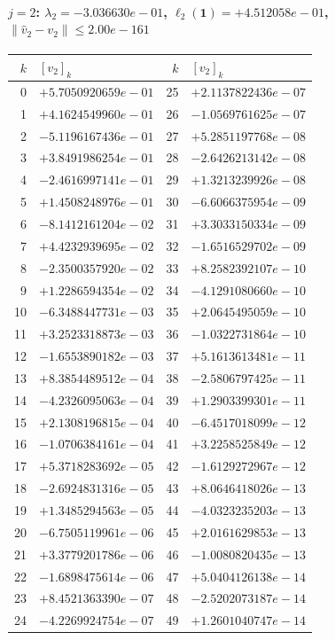 \documentclass[11pt]{article}
\begin{document}
\paragraph{$j = 2$: $\lambda_{2} = -3.036630e-01$, \quad $\ell_{2}(\mathbf{1}) = +4.512058e-01$, \quad $\|\hat v_{2} - v_{2}\| \leq 2.00e-161$}
\begin{center}
{\footnotesize
\begin{tabular}{r@{\;\;}l@{\quad}r@{\;\;}l}
\toprule
$k$ & $[v_{2}]_k$ & $k$ & $[v_{2}]_k$ \\
\midrule
0 & $+5.7050920659e-01$ & 25 & $+2.1137822436e-07$ \\
1 & $+4.1624549960e-01$ & 26 & $-1.0569761625e-07$ \\
2 & $-5.1196167436e-01$ & 27 & $+5.2851197768e-08$ \\
3 & $+3.8491986254e-01$ & 28 & $-2.6426213142e-08$ \\
4 & $-2.4616997141e-01$ & 29 & $+1.3213239926e-08$ \\
5 & $+1.4508248976e-01$ & 30 & $-6.6066375954e-09$ \\
6 & $-8.1412161204e-02$ & 31 & $+3.3033150334e-09$ \\
7 & $+4.4232939695e-02$ & 32 & $-1.6516529702e-09$ \\
8 & $-2.3500357920e-02$ & 33 & $+8.2582392107e-10$ \\
9 & $+1.2286594354e-02$ & 34 & $-4.1291080660e-10$ \\
10 & $-6.3488447731e-03$ & 35 & $+2.0645495059e-10$ \\
11 & $+3.2523318873e-03$ & 36 & $-1.0322731864e-10$ \\
12 & $-1.6553890182e-03$ & 37 & $+5.1613613481e-11$ \\
13 & $+8.3854489512e-04$ & 38 & $-2.5806797425e-11$ \\
14 & $-4.2326095063e-04$ & 39 & $+1.2903399301e-11$ \\
15 & $+2.1308196815e-04$ & 40 & $-6.4517018099e-12$ \\
16 & $-1.0706384161e-04$ & 41 & $+3.2258525849e-12$ \\
17 & $+5.3718283692e-05$ & 42 & $-1.6129272967e-12$ \\
18 & $-2.6924831316e-05$ & 43 & $+8.0646418026e-13$ \\
19 & $+1.3485294563e-05$ & 44 & $-4.0323235203e-13$ \\
20 & $-6.7505119961e-06$ & 45 & $+2.0161629853e-13$ \\
21 & $+3.3779201786e-06$ & 46 & $-1.0080820435e-13$ \\
22 & $-1.6898475614e-06$ & 47 & $+5.0404126138e-14$ \\
23 & $+8.4521363390e-07$ & 48 & $-2.5202073187e-14$ \\
24 & $-4.2269924754e-07$ & 49 & $+1.2601040747e-14$ \\
\bottomrule
\end{tabular}
}
\end{center}
\end{document}
